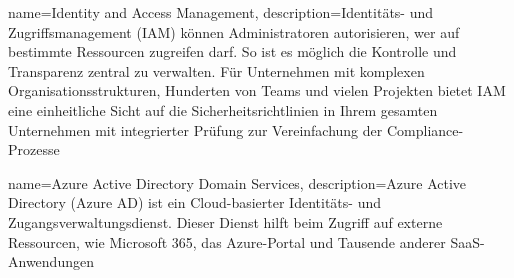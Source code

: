 


{
    name=Identity and Access Management,
    description={Identitäts- und Zugriffsmanagement (IAM) können Administratoren autorisieren, wer auf bestimmte Ressourcen zugreifen darf.
    So ist es möglich die Kontrolle und Transparenz zentral zu verwalten.
    Für Unternehmen mit komplexen Organisationsstrukturen, Hunderten von Teams und vielen Projekten bietet IAM eine einheitliche Sicht auf die Sicherheitsrichtlinien in Ihrem gesamten Unternehmen mit integrierter Prüfung zur Vereinfachung der Compliance-Prozesse}
}

{
    name=Azure Active Directory Domain Services,
    description={Azure Active Directory (Azure AD) ist ein Cloud-basierter Identitäts- und Zugangsverwaltungsdienst.
    Dieser Dienst hilft beim Zugriff auf externe Ressourcen, wie Microsoft 365, das Azure-Portal und Tausende anderer SaaS-Anwendungen}
}